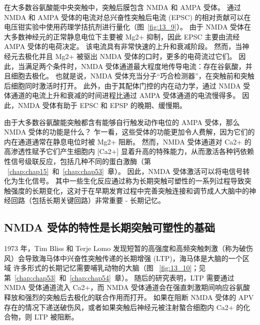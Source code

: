 在大多数谷氨酸能中央突触中，突触后膜包含 NMDA 和 AMPA 受体。
通过 NMDA 和 AMPA 受体的电流对总兴奋性突触后电流 (EPSC) 的相对贡献可以在电压钳实验中使用药理学拮抗剂进行量化（图~\ref{fig:13_9}）。
由于 NMDA 受体在大多数神经元的正常静息电位下主要被 Mg2+ 抑制，因此 EPSC 主要由流经 AMPA 受体的电荷决定。
该电流具有非常快速的上升和衰减阶段。
然而，当神经元去极化并且 Mg2+ 被驱出 NMDA 受体的口时，更多的电荷流过它们。
因此，当满足两个条件时，NMDA 受体通道最大程度地传导电流：存在谷氨酸，并且细胞去极化。
也就是说，NMDA 受体充当分子“巧合检测器”，在突触前和突触后细胞同时激活时打开。
此外，由于其配体门控的内在动力学，通过 NMDA 受体通道的电流上升和衰减的时间进程比通过 AMPA 受体通道的电流慢得多。
因此，NMDA 受体有助于 EPSC 和 EPSP 的晚期、缓慢期。


由于大多数谷氨酸能突触都含有能够自行触发动作电位的 AMPA 受体，那么 NMDA 受体的功能是什么？
乍一看，这些受体的功能更加令人费解，因为它们的内在通道通常在静息电位时被 Mg2+ 阻断。
然而，NMDA 受体通道对 Ca2+ 的高渗透性赋予它们产生细胞内 [Ca2+] 显着升高的特殊能力，从而激活各种钙依赖性信号级联反应，包括几种不同的蛋白激酶（第 ~\ref{chap:chap15}~和~\ref{chap:chap53}~章）。
因此，NMDA 受体激活可以将电信号转化为生化信号。 其中一些生化反应通过称为长期突触可塑性的一系列过程导致突触强度的长期变化，这对于在早期发育过程中完善突触连接和调节成人大脑中的神经回路（包括长期关键回路）非常重要 - 长期记忆。



\subsection{NMDA 受体的特性是长期突触可塑性的基础}

1973 年，Tim Bliss 和 Terje Lomo 发现短暂的高强度和高频突触刺激（称为破伤风）会导致海马体中兴奋性突触传递的长期增强 (LTP)，海马体是大脑的一个区域 许多形式的长期记忆需要哺乳动物的大脑（图 ~\ref{fig:13_10}；见第~\ref{chap:chap53}~和~\ref{chap:chap54}~章）。
随后的研究表明，LTP 需要通过 NMDA 受体通道流入 Ca2+，而 NMDA 受体通道会在强直刺激期间响应谷氨酸释放和强烈的突触后去极化的联合作用而打开。
如果在阻断 NMDA 受体的 APV 存在的情况下递送破伤风，或者如果突触后神经元被注射螯合细胞内 Ca2+ 的化合物，则 LTP 被阻断。


